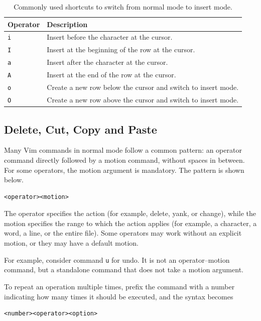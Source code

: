\begin{table}[!htb]
	\centering \caption{Commonly used shortcuts to switch from normal mode to insert mode.}\label{ch:tfe:tab:switchtoinsert}
	\begin{tabularx}{\textwidth}{lX}
		\hline
		Operator & Description \\ \hline
		\verb|i| & Insert before the character at the cursor. \\ 
		\verb|I| & Insert at the beginning of the row at the cursor. \\ 
		\verb|a| & Insert after the character at the cursor. \\ 
		\verb|A| & Insert at the end of the row at the cursor. \\ 
		\verb|o| & Create a new row below the cursor and switch to insert mode. \\ 
		\verb|O| & Create a new row above the cursor and switch to insert mode. \\
		\hline
	\end{tabularx}
\end{table}

\subsection{Delete, Cut, Copy and Paste}

Many Vim commands in normal mode follow a common pattern: an operator command directly followed by a motion command, without spaces in between. For some operators, the motion argument is mandatory. The pattern is shown below.
\begin{lstlisting}
<operator><motion>
\end{lstlisting}

The operator specifies the action (for example, delete, yank, or change), while the motion specifies the range to which the action applies (for example, a character, a word, a line, or the entire file). Some operators may work without an explicit motion, or they may have a default motion. 

For example, consider command \verb|u| for undo. It is not an operator–motion command, but a standalone command that does not take a motion argument.

To repeat an operation multiple times, prefix the command with a number indicating how many times it should be executed, and the syntax becomes
\begin{lstlisting}
<number><operator><option>
\end{lstlisting}

